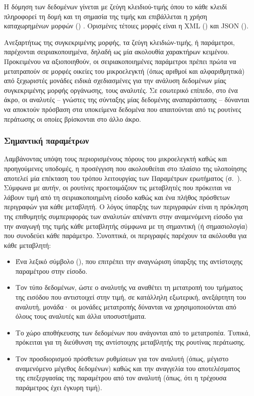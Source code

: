 Η δόμηση των δεδομένων γίνεται με ζεύγη κλειδιού-τιμής όπου το κάθε κλειδί
πληροφορεί τη δομή και τη σημασία της τιμής και επιβάλλεται η χρήση
καταχωρημένων μορφών () \parencite[90--92]{fielding00}. Ορισμένες
τέτοιες μορφές είναι η XML () και JSON
().

Ανεξαρτήτως της συγκεκριμένης μορφής, τα ζεύγη κλειδιών-τιμής, ή παράμετροι,
παρέχονται σειριακοποιημένα, δηλαδή ως μία ακολουθία χαρακτήρων κειμένου.
Προκειμένου να αξιοποιηθούν, οι σειριακοποιημένες παράμετροι πρέπει πρώτα να
μετατραπούν σε μορφές οικείες του μικροελεγκτή (όπως αριθμοί και αλφαριθμητικά)
από ξεχωριστές μονάδες ειδικά σχεδιασμένες για την ανάλυση δεδομένων μίας
συγκεκριμένης μορφής οργάνωσης, τους αναλυτές. Σε εσωτερικό επίπεδο, στο ένα
άκρο, οι αναλυτές -- γνώστες της σύνταξης μίας δεδομένης
αναπαράστασης -- δύνανται να αποκτούν πρόσβαση στα υποκείμενα δεδομένα που
απαιτούνται από τις ρουτίνες περάτωσης οι οποίες βρίσκονται στο άλλο άκρο.


\subsubsection{Σημαντική παραμέτρων}

Λαμβάνοντας υπόψη τους περιορισμένους πόρους του μικροελεγκτή καθώς και
προηγούμενες υποδομές, η προσέγγιση που ακολουθείται στο πλαίσιο της υλοποίησης
αποτελεί μία επέκταση του τρόπου λειτουργίας των Παραμέτρων ερωτήματος
(σ.~\pageref{ssubsec:network:query-string}). Σύμφωνα με αυτήν, οι ρουτίνες
προετοιμάζουν τις μεταβλητές που πρόκειται να λάβουν τιμή από τη
σειριακοποιημένη είσοδο καθώς και ένα πλήθος πρόσθετων περιγραφών για κάθε
μεταβλητή. Ο λόγος ύπαρξης των περιγραφών είναι η πρόκληση της επιθυμητής
συμπεριφοράς των αναλυτών απέναντι στην αναμενόμενη είσοδο για την αναγωγή της
τιμής κάθε μεταβλητής σύμφωνα με τη σημαντική (ή σημασιολογία) που συνοδεύει
κάθε παράμετρο. Συνοπτικά, οι περιγραφές παρέχουν τα ακόλουθα για κάθε
μεταβλητή:
\begin{itemize}
    \item Ένα λεξικό σύμβολο (), που επιτρέπει την αναγνώριση ύπαρξης
    της αντίστοιχης παραμέτρου στην είσοδο.

    \item Τον τύπο δεδομένων, ώστε ο αναλυτής να αναθέτει τη μετατροπή του
    τμήματος της εισόδου που αντιστοιχεί στην τιμή, σε κατάλληλη εξωτερική,
    ανεξάρτητη του αναλυτή, μονάδα· οι μονάδες μετατροπής δύνανται να
    χρησιμοποιούνται από όλους τους αναλυτές και άλλα υποσυστήματα.

    \item Το χώρο αποθήκευσης των δεδομένων που ανάγονται από το μετατροπέα.
    Τυπικά, πρόκειται για τη διεύθυνση της αντίστοιχης μεταβλητής της ρουτίνας
    περάτωσης.

    \item Τον προσδιορισμού πρόσθετων ρυθμίσεων για τον αναλυτή (όπως, μέγιστο
    αναμενόμενο μέγεθος δεδομένων) καθώς και την αναγγελία του αποτελέσματος της
    επεξεργασίας της παραμέτρου από τον αναλυτή (όπως, ότι η τρέχουσα παράμετρος
    έχει έγκυρη τιμή).
\end{itemize}

